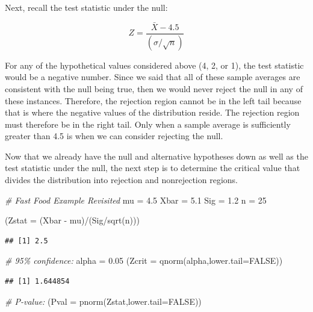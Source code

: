 \documentclass[
]{book}
\newenvironment{Shaded}{\begin{snugshade}}{\end{snugshade}}
\newcommand{\AttributeTok}[1]{\textcolor[rgb]{0.77,0.63,0.00}{#1}}
\newcommand{\CommentTok}[1]{\textcolor[rgb]{0.56,0.35,0.01}{\textit{#1}}}
\newcommand{\ConstantTok}[1]{\textcolor[rgb]{0.00,0.00,0.00}{#1}}
\newcommand{\DecValTok}[1]{\textcolor[rgb]{0.00,0.00,0.81}{#1}}
\newcommand{\FloatTok}[1]{\textcolor[rgb]{0.00,0.00,0.81}{#1}}
\newcommand{\FunctionTok}[1]{\textcolor[rgb]{0.00,0.00,0.00}{#1}}
\newcommand{\NormalTok}[1]{#1}
\newcommand{\OtherTok}[1]{\textcolor[rgb]{0.56,0.35,0.01}{#1}}
\newcommand{\SpecialCharTok}[1]{\textcolor[rgb]{0.00,0.00,0.00}{#1}}
\begin{document}
Next, recall the test statistic under the null:

\[ Z = \frac{\bar{X}-4.5}{\left(\sigma / \sqrt{n} \right)}\]

For any of the hypothetical values considered above (4, 2, or 1), the test statistic would be a negative number. Since we said that all of these sample averages are consistent with the null being true, then we would never reject the null in any of these instances. Therefore, the rejection region cannot be in the left tail because that is where the negative values of the distribution reside. The rejection region must therefore be in the right tail. Only when a sample average is sufficiently greater than 4.5 is when we can consider rejecting the null.

Now that we already have the null and alternative hypotheses down as well as the test statistic under the null, the next step is to determine the critical value that divides the distribution into rejection and nonrejection regions.

\begin{Shaded}
\begin{Highlighting}[]
\CommentTok{\# Fast Food Example Revisited}
\NormalTok{mu }\OtherTok{=} \FloatTok{4.5}
\NormalTok{Xbar }\OtherTok{=} \FloatTok{5.1}
\NormalTok{Sig }\OtherTok{=} \FloatTok{1.2}
\NormalTok{n }\OtherTok{=} \DecValTok{25}

\NormalTok{(}\AttributeTok{Zstat =}\NormalTok{ (Xbar }\SpecialCharTok{{-}}\NormalTok{ mu)}\SpecialCharTok{/}\NormalTok{(Sig}\SpecialCharTok{/}\FunctionTok{sqrt}\NormalTok{(n)))}
\end{Highlighting}
\end{Shaded}

\begin{verbatim}
## [1] 2.5
\end{verbatim}

\begin{Shaded}
\begin{Highlighting}[]
\CommentTok{\# 95\% confidence:}
\NormalTok{alpha }\OtherTok{=} \FloatTok{0.05}
\NormalTok{(}\AttributeTok{Zcrit =} \FunctionTok{qnorm}\NormalTok{(alpha,}\AttributeTok{lower.tail=}\ConstantTok{FALSE}\NormalTok{))}
\end{Highlighting}
\end{Shaded}

\begin{verbatim}
## [1] 1.644854
\end{verbatim}

\begin{Shaded}
\begin{Highlighting}[]
\CommentTok{\# P{-}value:}
\NormalTok{(}\AttributeTok{Pval =} \FunctionTok{pnorm}\NormalTok{(Zstat,}\AttributeTok{lower.tail=}\ConstantTok{FALSE}\NormalTok{))}
\end{Highlighting}
\end{Shaded}
\end{document}
